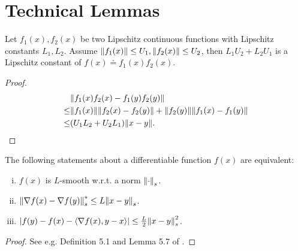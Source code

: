 \documentclass[twoside,11pt]{article}
\newcommand{\indot}[2]{{\left<#1, #2\right>}}
\numberwithin{assucounter}{section}
\begin{document}
\section{Technical Lemmas}
\begin{lemma}
  \label{lem product of lipschitz functions}
  Let $f_1(x), f_2(x)$ be two Lipschitz continuous functions with Lipschitz constants $L_1, L_2$.
  Assume $\norm{f_1(x)} \leq U_1, \norm{f_2(x)} \leq U_2$,
  then
  $L_1U_2 + L_2U_1$ is a Lipschitz constant of $f(x) \doteq f_1(x)f_2(x)$. 
\end{lemma}
\begin{proof}
  \begin{align}
    &\norm{f_1(x)f_2(x) - f_1(y)f_2(y)} \\
    \leq& \norm{f_1(x)} \norm{f_2(x) - f_2(y)} + \norm{f_2(y)}\norm{f_1(x) - f_1(y)} \\
    \leq& (U_1 L_2 + U_2L_1) \norm{x-y}.
  \end{align}
\end{proof}

\begin{lemma}
  \label{lem smooth definition}
  The following statements about a differentiable function $f(x)$ are equivalent:
  \begin{enumerate} [(i).]
    \item $f(x)$ is $L$-smooth w.r.t. a norm $\norm{\cdot}_s$.
    \item $\norm{\nabla f(x) - \nabla f(y)}_s^* \leq L \norm{x - y}_s$.
    \item $\abs{f(y) - f(x) - \indot{\nabla f(x)}{y - x}} \leq \frac{L}{2}\norm{x - y}^2_s$.
  \end{enumerate}
\end{lemma}
\begin{proof}
  See e.g. Definition 5.1 and Lemma 5.7 of \citet{beck2017first}.
\end{proof}
\end{document}
